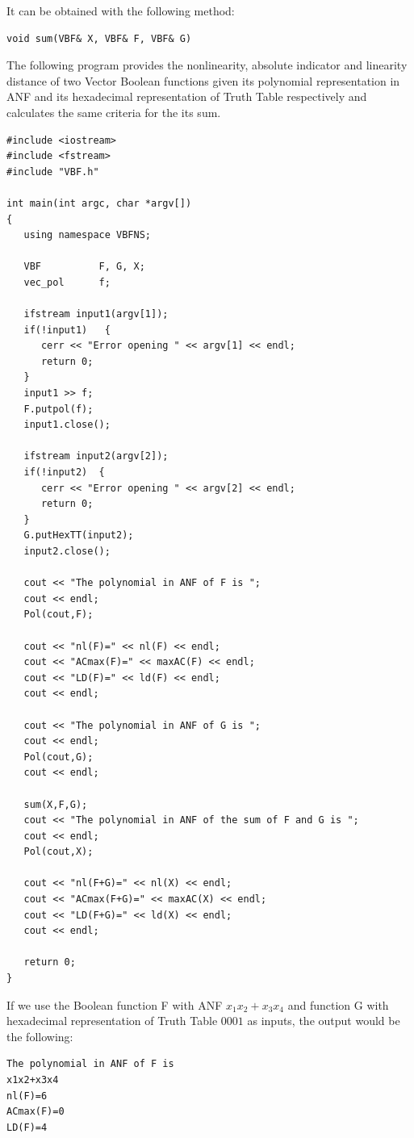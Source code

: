 It can be obtained with the following method:

\begin{verbatim}
void sum(VBF& X, VBF& F, VBF& G)  
\end{verbatim}

\begin{example}
The following program provides the nonlinearity, absolute indicator and linearity distance of two Vector Boolean functions given its polynomial representation in ANF and its hexadecimal representation of Truth Table respectively and calculates the same criteria for the its sum.

\begin{verbatim}
#include <iostream>
#include <fstream>
#include "VBF.h"

int main(int argc, char *argv[])
{
   using namespace VBFNS;

   VBF          F, G, X;
   vec_pol      f;

   ifstream input1(argv[1]);
   if(!input1)   {
      cerr << "Error opening " << argv[1] << endl;
      return 0;
   }
   input1 >> f;
   F.putpol(f);
   input1.close();

   ifstream input2(argv[2]);
   if(!input2)  {
      cerr << "Error opening " << argv[2] << endl;
      return 0;
   }
   G.putHexTT(input2);
   input2.close();

   cout << "The polynomial in ANF of F is ";
   cout << endl;
   Pol(cout,F);

   cout << "nl(F)=" << nl(F) << endl;
   cout << "ACmax(F)=" << maxAC(F) << endl;
   cout << "LD(F)=" << ld(F) << endl;
   cout << endl;

   cout << "The polynomial in ANF of G is ";
   cout << endl;
   Pol(cout,G);
   cout << endl;

   sum(X,F,G);
   cout << "The polynomial in ANF of the sum of F and G is ";
   cout << endl;
   Pol(cout,X);

   cout << "nl(F+G)=" << nl(X) << endl;
   cout << "ACmax(F+G)=" << maxAC(X) << endl;
   cout << "LD(F+G)=" << ld(X) << endl;
   cout << endl;

   return 0;
}
\end{verbatim}

If we use the Boolean function F with ANF $x_1x_2+x_3x_4$ and function G with hexadecimal representation of Truth Table $0001$ as inputs, the output would be the following:

\begin{verbatim}
The polynomial in ANF of F is
x1x2+x3x4
nl(F)=6
ACmax(F)=0
LD(F)=4


\end{verbatim}
\end{example}
